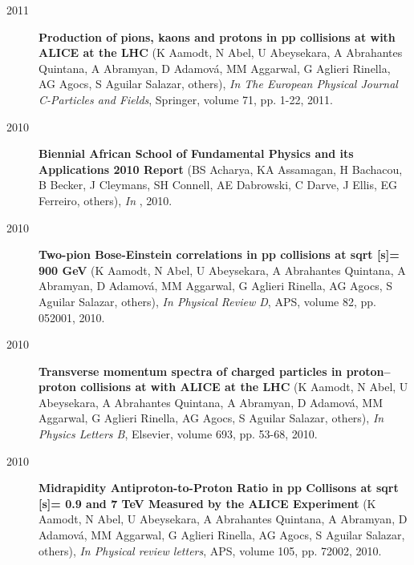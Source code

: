 \begin{description}
\item[2011]{\bf Production of pions, kaons and protons in pp collisions at with ALICE at the LHC} (K Aamodt, N Abel, U Abeysekara, A Abrahantes Quintana, A Abramyan, D Adamová, MM Aggarwal, G Aglieri Rinella, AG Agocs, S Aguilar Salazar, others), {\em In The European Physical Journal C-Particles and Fields}, Springer, volume 71, pp. 1-22, 2011.
\item[2010]{\bf Biennial African School of Fundamental Physics and its Applications 2010 Report} (BS Acharya, KA Assamagan, H Bachacou, B Becker, J Cleymans, SH Connell, AE Dabrowski, C Darve, J Ellis, EG Ferreiro, others), {\em In }, 2010.
\item[2010]{\bf Two-pion Bose-Einstein correlations in pp collisions at sqrt [s]= 900 GeV} (K Aamodt, N Abel, U Abeysekara, A Abrahantes Quintana, A Abramyan, D Adamová, MM Aggarwal, G Aglieri Rinella, AG Agocs, S Aguilar Salazar, others), {\em In Physical Review D}, APS, volume 82, pp. 052001, 2010.
\item[2010]{\bf Transverse momentum spectra of charged particles in proton--proton collisions at with ALICE at the LHC} (K Aamodt, N Abel, U Abeysekara, A Abrahantes Quintana, A Abramyan, D Adamová, MM Aggarwal, G Aglieri Rinella, AG Agocs, S Aguilar Salazar, others), {\em In Physics Letters B}, Elsevier, volume 693, pp. 53-68, 2010.
\item[2010]{\bf Midrapidity Antiproton-to-Proton Ratio in pp Collisons at sqrt [s]= 0.9 and 7 TeV Measured by the ALICE Experiment} (K Aamodt, N Abel, U Abeysekara, A Abrahantes Quintana, A Abramyan, D Adamová, MM Aggarwal, G Aglieri Rinella, AG Agocs, S Aguilar Salazar, others), {\em In Physical review letters}, APS, volume 105, pp. 72002, 2010.

\end{description}
